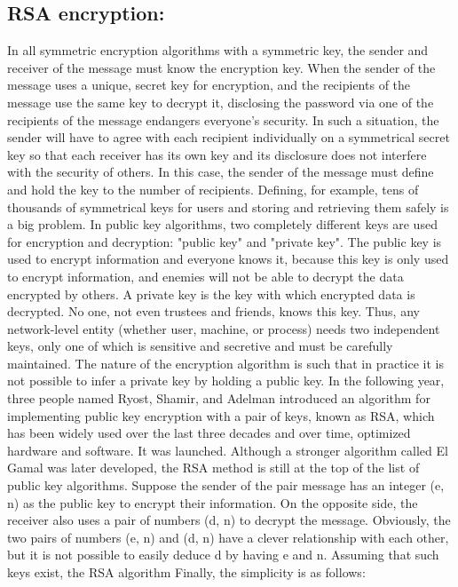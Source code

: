 \begin{flushleft}
\subsection{RSA encryption:
}
In all symmetric encryption algorithms with a symmetric key, the sender and receiver of the message must know the encryption key. When the sender of the message uses a unique, secret key for encryption, and the recipients of the message use the same key to decrypt it, disclosing the password via one of the recipients of the message endangers everyone's security. In such a situation, the sender will have to agree with each recipient individually on a symmetrical secret key so that each receiver has its own key and its disclosure does not interfere with the security of others. In this case, the sender of the message must define and hold the key to the number of recipients. Defining, for example, tens of thousands of symmetrical keys for users and storing and retrieving them safely is a big problem.
In public key algorithms, two completely different keys are used for encryption and decryption: "public key" and "private key".
The public key is used to encrypt information and everyone knows it, because this key is only used to encrypt information, and enemies will not be able to decrypt the data encrypted by others.
A private key is the key with which encrypted data is decrypted. No one, not even trustees and friends, knows this key. Thus, any network-level entity (whether user, machine, or process) needs two independent keys, only one of which is sensitive and secretive and must be carefully maintained. The nature of the encryption algorithm is such that in practice it is not possible to infer a private key by holding a public key.
In the following year, three people named Ryost, Shamir, and Adelman introduced an algorithm for implementing public key encryption with a pair of keys, known as RSA, which has been widely used over the last three decades and over time, optimized hardware and software. It was launched. Although a stronger algorithm called El Gamal was later developed, the RSA method is still at the top of the list of public key algorithms.
Suppose the sender of the pair message has an integer (e, n) as the public key to encrypt their information. On the opposite side, the receiver also uses a pair of numbers (d, n) to decrypt the message. Obviously, the two pairs of numbers (e, n) and (d, n) have a clever relationship with each other, but it is not possible to easily deduce d by having e and n. Assuming that such keys exist, the RSA algorithm Finally, the simplicity is as follows:

\end{flushleft}

